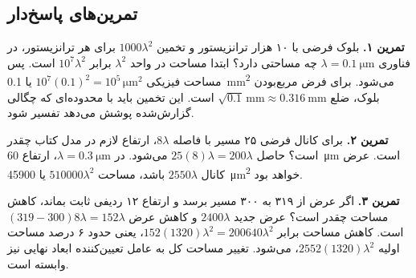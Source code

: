 \clearpage
\subsection{تمرین‌های پاسخ‌دار }
\textbf{تمرین ۱.} بلوک فرضی با ۱۰ هزار ترانزیستور و تخمین
\(1000\lambda^2\) برای هر ترانزیستور، در فناوری \(\lambda=\qty{0.1}{\micro\metre}\)
چه مساحتی دارد؟ ابتدا مساحت در واحد \(\lambda^2\) برابر \(10^7\lambda^2\) است.
پس مساحت فیزیکی \(10^7(0.1)^2=10^5\,\unit{\micro\metre\squared}\) یا
\qty{0.1}{\milli\metre\squared} می‌شود. برای فرض مربع‌بودن بلوک، ضلع
\(\sqrt{0.1}\,\unit{\milli\metre}\approx\qty{0.316}{\milli\metre}\) است.
این تخمین باید با محدوده‌ای که چگالی گزارش‌شده پوشش می‌دهد تفسیر شود.

\textbf{تمرین ۲.} برای کانال فرضی ۲۵ مسیر با فاصله \(8\lambda\)، ارتفاع لازم
در مدل کتاب چقدر است؟ حاصل \(25(8)\lambda=200\lambda\) می‌شود.
در \(\lambda=\qty{0.3}{\micro\metre}\)، ارتفاع \qty{60}{\micro\metre} است.
عرض کانال \(2550\lambda\) باشد، مساحت \(510000\lambda^2\) یا
\qty{45900}{\micro\metre\squared} خواهد بود.

\textbf{تمرین ۳.} اگر عرض  از ۳۱۹ به ۳۰۰ مسیر برسد و ارتفاع
۱۲ ردیفی ثابت بماند، کاهش مساحت چقدر است؟ عرض جدید \(2400\lambda\) و کاهش
عرض \((319-300)8\lambda=152\lambda\) است. کاهش مساحت برابر
\(152(1320)\lambda^2=200640\lambda^2\)، یعنی حدود ۶ درصد مساحت اولیه
\(2552(1320)\lambda^2\)، می‌شود. تغییر مساحت کل  به عامل تعیین‌کننده
ابعاد نهایی نیز وابسته است.
\clearpage
